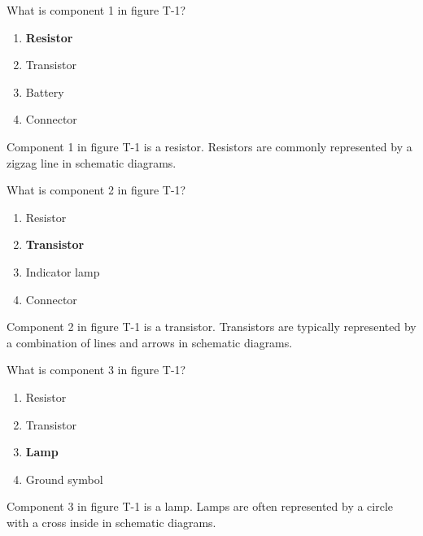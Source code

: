 
\begin{tcolorbox}[colback=gray!10!white,colframe=black!75!black,title={T6C02}]
    What is component 1 in figure T-1?
    \begin{enumerate}[label=\Alph*),noitemsep]
        \item \textbf{Resistor}
        \item Transistor
        \item Battery
        \item Connector
    \end{enumerate}
\end{tcolorbox}
Component 1 in figure T-1 is a resistor. Resistors are commonly represented by a zigzag line in schematic diagrams.


\begin{tcolorbox}[colback=gray!10!white,colframe=black!75!black,title={T6C03}]
    What is component 2 in figure T-1?
    \begin{enumerate}[label=\Alph*),noitemsep]
        \item Resistor
        \item \textbf{Transistor}
        \item Indicator lamp
        \item Connector
    \end{enumerate}
\end{tcolorbox}
Component 2 in figure T-1 is a transistor. Transistors are typically represented by a combination of lines and arrows in schematic diagrams.


\begin{tcolorbox}[colback=gray!10!white,colframe=black!75!black,title={T6C04}]
    What is component 3 in figure T-1?
    \begin{enumerate}[label=\Alph*),noitemsep]
        \item Resistor
        \item Transistor
        \item \textbf{Lamp}
        \item Ground symbol
    \end{enumerate}
\end{tcolorbox}
Component 3 in figure T-1 is a lamp. Lamps are often represented by a circle with a cross inside in schematic diagrams.



